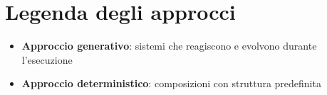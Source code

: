 \documentclass[a4paper,12pt]{article}
\begin{document}
\section*{Legenda degli approcci}
\begin{itemize}
  \item \textbf{Approccio generativo}: sistemi che reagiscono e evolvono durante l'esecuzione
  \item \textbf{Approccio deterministico}: composizioni con struttura predefinita
\end{itemize}
\end{document}
